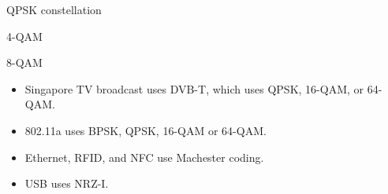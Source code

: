\begin{cf}{
	QPSK constellation
	\vspace{1cm}

}
\end{cf}

\begin{cf}{
	4-QAM
	\vspace{1cm}

}
\end{cf}

\begin{cf}{
	8-QAM
	\vspace{1cm}


}
\end{cf}

\begin{cf}{\small
	\begin{itemize}
	\item Singapore TV broadcast uses DVB-T, which uses QPSK, 16-QAM, or 64-QAM.
	\item 802.11a uses BPSK, QPSK, 16-QAM or 64-QAM.
	\item Ethernet, RFID, and NFC use Machester coding.
	\item USB uses NRZ-I.
	\end{itemize}
}
\end{cf}
